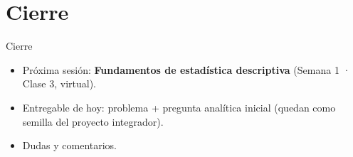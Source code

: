 \documentclass[aspectratio=169,11pt]{beamer}
\begin{document}
\section{Cierre}
\begin{frame}{Cierre}
  \begin{itemize}
    \item Próxima sesión: \textbf{Fundamentos de estadística descriptiva} (Semana 1 · Clase 3, virtual).
    \item Entregable de hoy: problema + pregunta analítica inicial (quedan como semilla del proyecto integrador).
    \item Dudas y comentarios.
  \end{itemize}
\end{frame}

{
\begin{frame}[plain]
\end{frame}
}
\end{document}
